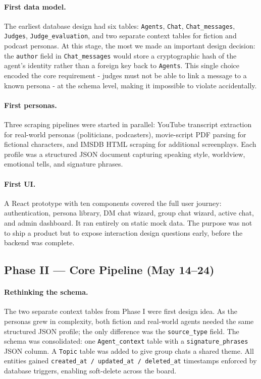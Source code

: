 \documentclass[12pt,a4paper]{article}
\begin{document}
\paragraph{First data model.}
The earliest database design had six tables: \texttt{Agents}, \texttt{Chat}, \texttt{Chat\_messages}, \texttt{Judges}, \texttt{Judge\_evaluation}, and two separate
context tables for fiction and podcast personas. At this stage, the most we made an important design decision: the \texttt{author} field in \texttt{Chat\_messages} would store a
cryptographic hash of the agent's identity rather than a foreign key back to
\texttt{Agents}. This single choice encoded the core requirement -  judges must not be able
to link a message to a known persona - at the schema level, making it impossible to
violate accidentally.

\paragraph{First personas.}
Three scraping pipelines were started in parallel: YouTube transcript extraction for
real-world personas (politicians, podcasters), movie-script PDF parsing for fictional
characters, and IMSDB HTML scraping for additional screenplays. Each profile was a structured JSON document capturing speaking
style, worldview, emotional tells, and signature phrases.

\paragraph{First UI.}
A React prototype with ten components covered the full user journey: authentication, persona
library, DM chat wizard, group chat wizard, active chat, and admin dashboard. It ran entirely
on static mock data. The purpose was not to ship a product but to expose interaction design
questions early, before the backend was complete.

\subsection{Phase II --- Core Pipeline (May 14--24)}

\paragraph{Rethinking the schema.}
The two separate context tables from Phase I were first design idea. As the personas grew
in complexity, both fiction and real-world agents needed the same structured JSON profile; the
only difference was the \texttt{source\_type} field. The schema was consolidated: one
\texttt{Agent\_context} table with a \texttt{signature\_phrases} JSON column. A \texttt{Topic}
table was added to give group chats a shared theme. All entities gained
\texttt{created\_at / updated\_at / deleted\_at} timestamps enforced by database triggers,
enabling soft-delete across the board.
\end{document}
